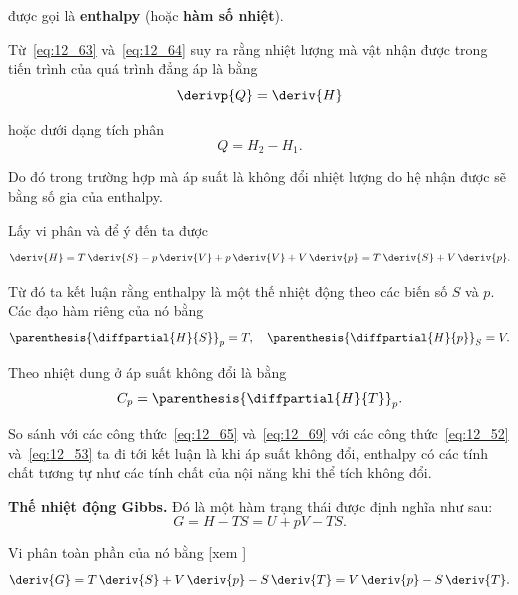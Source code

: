 \noindent
được gọi là \textbf{enthalpy} (hoặc \textbf{hàm số nhiệt}).

Từ~\eqref{eq:12_63} và~\eqref{eq:12_64} suy ra rằng nhiệt lượng mà vật nhận được trong tiến trình của quá trình đẳng áp là bằng
\begin{equation}\label{eq:12_65}
	\derivp{Q} = \deriv{H}
\end{equation}

\noindent
hoặc dưới dạng tích phân
\begin{equation}\label{eq:12_66}
	Q = H_2 - H_1.
\end{equation}

\noindent
Do đó trong trường hợp mà áp suất là không đổi nhiệt lượng do hệ nhận được sẽ bằng số gia của enthalpy.

Lấy vi phân  và để ý đến  ta được
\begin{equation}\label{eq:12_67}
	\deriv{H} = T\,\deriv{S} - p\,\deriv{V} + p\,\deriv{V} + V\,\deriv{p} = T\,\deriv{S} + V\,\deriv{p}.
\end{equation}

\noindent
Từ đó ta kết luận rằng enthalpy là một thế nhiệt động theo các biến số $S$ và $p$. Các đạo hàm riêng của nó bằng
\begin{equation}\label{eq:12_68}
	\parenthesis{\diffpartial{H}{S}}_p = T,\quad 	\parenthesis{\diffpartial{H}{p}}_S = V.
\end{equation}

Theo  nhiệt dung ở áp suất không đổi là bằng
\begin{equation}\label{eq:12_69}
	C_p = \parenthesis{\diffpartial{H}{T}}_p.
\end{equation}

\noindent
So sánh với các công thức~\eqref{eq:12_65} và~\eqref{eq:12_69} với các công thức~\eqref{eq:12_52} và~\eqref{eq:12_53} ta đi tới kết luận là khi áp suất không đổi, enthalpy có các tính chất tương tự như các tính chất của nội năng khi thể tích không đổi.

\textbf{Thế nhiệt động Gibbs.} Đó là một hàm trạng thái được định nghĩa như sau:
\begin{equation}\label{eq:12_70}
	G = H - TS = U + pV - TS.
\end{equation}

\noindent
Vi phân toàn phần của nó bằng [xem ]
\begin{equation}\label{eq:12_71}
	\deriv{G} = T\,\deriv{S} + V\,\deriv{p} - S\,\deriv{T} = V\,\deriv{p} - S\,\deriv{T}.
\end{equation}

